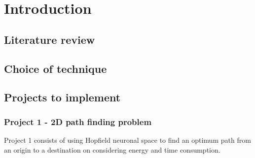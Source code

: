 \chapter{Introduction}
\label{cha:introduction}
\section{Literature review}
\label{sec:review}

\section{Choice of technique}
\label{sec:choice}

\section{Projects to implement}
\label{sec:projects}

\subsection{Project 1 - 2D path finding problem}
\label{ssec:project1}

Project 1 consists of using Hopfield neuronal space to find an optimum path from an origin to a destination
on considering energy and time consumption.